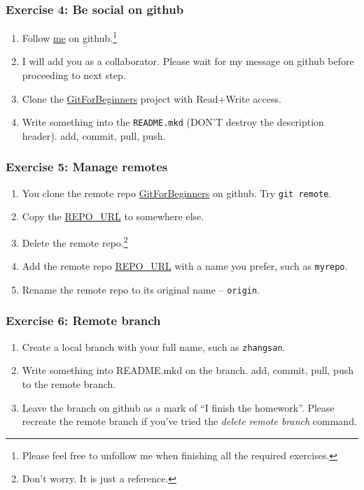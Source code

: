 \documentclass[11pt,ignorenonframetext,]{beamer}
\begin{document}
\begin{frame}[fragile]\frametitle{Exercise 4: Be social on github}

\begin{enumerate}[1.]
\item
  Follow \href{https://github.com/weijianwen}{me} on github.\footnote{Please
    feel free to unfollow me when finishing all the required exercises.}
\item
  I will add you as a collaborator. Please wait for my message on github
  before proceeding to next step.
\item
  Clone the
  \href{https://github.com/weijianwen/GitForBeginners}{GitForBeginners}
  project with Read+Write access.
\item
  Write something into the \texttt{README.mkd} (DON'T destroy the
  description header). add, commit, pull, push.
\end{enumerate}
\end{frame}

\begin{frame}[fragile]\frametitle{Exercise 5: Manage remotes}

\begin{enumerate}[1.]
\item
  You clone the remote repo
  \href{https://github.com/weijianwen/GitForBeginners}{GitForBeginners}
  on github. Try \texttt{git remote}.
\item
  Copy the
  \href{git@github.com:weijianwen/GitForBeginners.git}{REPO\_URL} to
  somewhere else.
\item
  Delete the remote repo.\footnote{Don't worry. It is just a reference.}
\item
  Add the remote repo
  \href{git@github.com:weijianwen/GitForBeginners.git}{REPO\_URL} with a
  name you prefer, such as \texttt{myrepo}.
\item
  Rename the remote repo to its original name -- \texttt{origin}.
\end{enumerate}
\end{frame}

\begin{frame}[fragile]\frametitle{Exercise 6: Remote branch}

\begin{enumerate}[1.]
\item
  Create a local branch with your full name, such as \texttt{zhangsan}.
\item
  Write something into README.mkd on the branch. add, commit, pull, push
  to the remote branch.
\item
  Leave the branch on github as a mark of ``I finish the homework''.
  Please recreate the remote branch if you've tried the \emph{delete
  remote branch} command.
\end{enumerate}
\end{frame}
\end{document}
